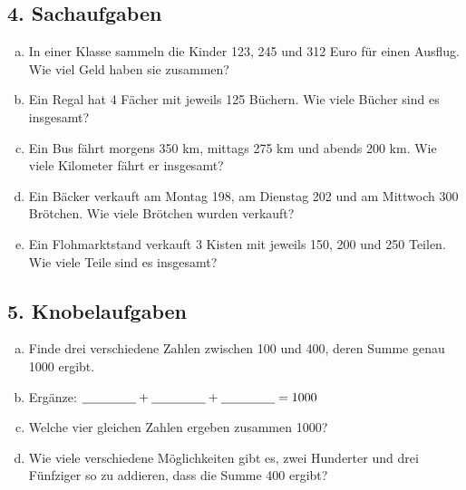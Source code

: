 \subsection*{4. Sachaufgaben}
\begin{enumerate}[a)]
    \item In einer Klasse sammeln die Kinder 123, 245 und 312 Euro für einen Ausflug. Wie viel Geld haben sie zusammen?
    \item Ein Regal hat 4 Fächer mit jeweils 125 Büchern. Wie viele Bücher sind es insgesamt?
    \item Ein Bus fährt morgens 350 km, mittags 275 km und abends 200 km. Wie viele Kilometer fährt er insgesamt?
    \item Ein Bäcker verkauft am Montag 198, am Dienstag 202 und am Mittwoch 300 Brötchen. Wie viele Brötchen wurden verkauft?
    \item Ein Flohmarktstand verkauft 3 Kisten mit jeweils 150, 200 und 250 Teilen. Wie viele Teile sind es insgesamt?
\end{enumerate}

\subsection*{5. Knobelaufgaben}
\begin{enumerate}[a)]
    \item Finde drei verschiedene Zahlen zwischen 100 und 400, deren Summe genau 1000 ergibt.
    \item Ergänze: $\underline{\hspace{1.5cm}} + \underline{\hspace{1.5cm}} + \underline{\hspace{1.5cm}} = 1000$
    \item Welche vier gleichen Zahlen ergeben zusammen 1000?
    \item Wie viele verschiedene Möglichkeiten gibt es, zwei Hunderter und drei Fünfziger so zu addieren, dass die Summe 400 ergibt?
\end{enumerate}

